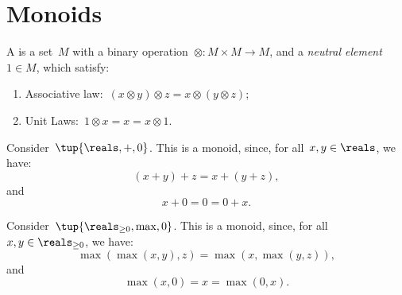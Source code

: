 

\section{Monoids}


\begin{definition}[Monoid]
    A  is a set~$M$ with a binary operation~$\otimes \colon M\times M\to M$, and a \emph{neutral element}~$1\in M$, which satisfy:
    \begin{enumerate}
        \item Associative law:~$(x\otimes y)\otimes z=x\otimes (y\otimes z)$;
        \item Unit Laws:~$1\otimes x=x=x\otimes 1$.
    \end{enumerate}
\end{definition}
\begin{example}
    Consider~$\tup{\reals,+,0}$. This is a monoid, since, for all~$x,y\in \reals$, we have:
    \begin{equation*}
    (x+y)
        +z=x+(y+z),
    \end{equation*}
    and
    \begin{equation*}
        x+0=0=0+x.
    \end{equation*}
\end{example}

\begin{example}
    Consider~$\tup{\reals_{\geq0},\max,0}$. This is a monoid, since, for all~$x,y\in \reals_{\geq0}$, we have:
    \begin{equation*}
        \max(\max(x,y),z)=\max(x,\max(y,z)),
    \end{equation*}
    and
    \begin{equation*}
        \max(x,0)=x=\max(0,x).
    \end{equation*}
\end{example}

